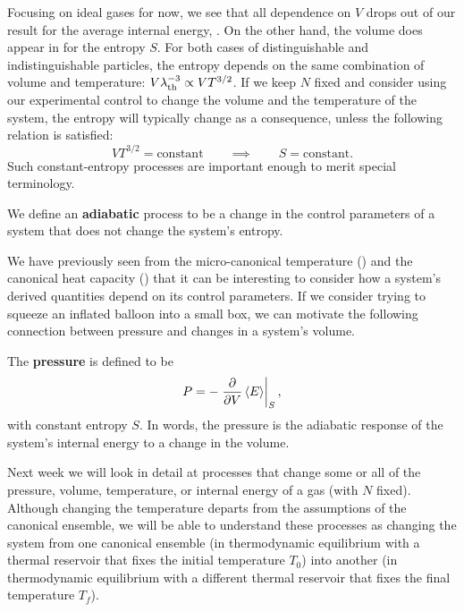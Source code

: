 Focusing on ideal gases for now, we see that all dependence on $V$ drops out of our result for the average internal energy, .
On the other hand, the volume does appear in  for the entropy $S$.
For both cases of distinguishable and indistinguishable particles, the entropy depends on the same combination of volume and temperature: $V \lambda_{\mathrm{th}}^{-3} \propto V T^{3/2}$.
If we keep $N$ fixed and consider using our experimental control to change the volume and the temperature of the system, the entropy will typically change as a consequence, unless the following relation is satisfied:
\begin{equation*}
  V T^{3/2} = \mbox{constant} \qquad \implies \qquad S = \mbox{constant.}
\end{equation*}
Such constant-entropy processes are important enough to merit special terminology.

\begin{shaded}
  We define an \textbf{adiabatic} process to be a change in the control parameters of a system that does not change the system's entropy.
\end{shaded}

We have previously seen from the micro-canonical temperature () and the canonical heat capacity () that it can be interesting to consider how a system's derived quantities depend on its control parameters.
If we consider trying to squeeze an inflated balloon into a small box, we can motivate the following connection between pressure and changes in a system's volume.

\begin{shaded}
  The \textbf{pressure} is defined to be
  \begin{equation}
    \label{eq:pressure}
    P = -\left. \frac{\partial }{\partial V} \left\langle E \right\rangle\right|_S,
  \end{equation}
  with constant entropy $S$.
  In words, the pressure is the adiabatic response of the system's internal energy to a change in the volume.
\end{shaded}

Next week we will look in detail at processes that change some or all of the pressure, volume, temperature, or internal energy of a gas (with $N$ fixed).
Although changing the temperature departs from the assumptions of the canonical ensemble, we will be able to understand these processes as changing the system from one canonical ensemble (in thermodynamic equilibrium with a thermal reservoir that fixes the initial temperature $T_0$) into another (in thermodynamic equilibrium with a different thermal reservoir that fixes the final temperature $T_f$).


